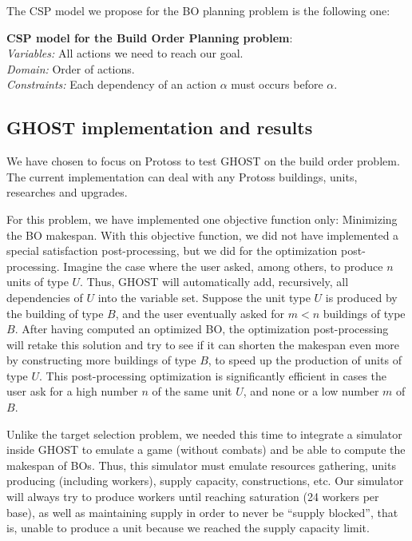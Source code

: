 \documentclass[journal]{IEEEtran}
\newcommand{\csp}{\textsc{CSP}\xspace}
\newcommand{\ghost}{\textsc{GHOST}\xspace}
\newcommand{\modelcsp}[4]%
{ \begin{trivlist}
  \item[]%
    \textbf{CSP model for #1}:\\
    \textit{Variables:} #2\\
    \textit{Domain:} #3\\
    \textit{Constraints:} #4
  \end{trivlist}%
}
\begin{document}
The \csp model we propose for  the BO planning problem is the
following one:
\modelcsp{the Build Order Planning problem}%
{All actions we need to reach our goal.}%
{Order of actions.}%
{Each dependency of an action $\alpha$ must occurs before $\alpha$.}

\subsection{\ghost implementation and results}

We have chosen to  focus on Protoss to test \ghost  on the build order
problem.   The  current  implementation  can  deal  with  any  Protoss
buildings, units, researches and upgrades.

For this  problem, we  have implemented  one objective  function only:
Minimizing the BO makespan.  With  this objective function, we did not
have implemented  a special  satisfaction post-processing, but  we did
for the optimization post-processing. Imagine  the case where the user
asked, among  others, to produce $n$  units of type $U$.  Thus, \ghost
will automatically add, recursively, all  dependencies of $U$ into the
variable set.  Suppose  the unit type $U$ is produced  by the building
of type $B$,  and the user eventually  asked for $m <  n$ buildings of
type $B$.   After having  computed an  optimized BO,  the optimization
post-processing will  retake this solution  and try  to see if  it can
shorten the makespan even more  by constructing more buildings of type
$B$,  to  speed  up  the  production  of  units  of  type  $U$.   This
post-processing optimization  is significantly efficient in  cases the
user ask for a high number $n$ of the same unit $U$, and none or a low
number $m$ of $B$.

Unlike the target selection problem,  we needed this time to integrate
a simulator inside  \ghost to emulate a game (without  combats) and be
able to  compute the  makespan of BOs. Thus,  this simulator
must emulate resources gathering, units producing (including workers),
supply capacity, constructions, etc.  Our simulator will always try to
produce workers  until reaching saturation  (24 workers per  base), as
well as  maintaining supply in  order to never be  ``supply blocked'',
that  is, unable  to  produce a  unit because  we  reached the  supply
capacity limit.
\end{document}
